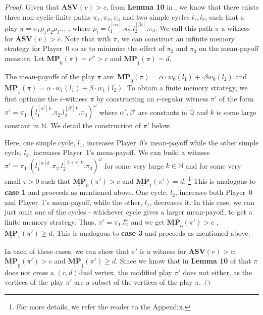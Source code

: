 \begin{proof}
Given that $\mathbf{ASV}(v) > c$, from \textbf{Lemma 10} in \cite{FGR20}, we know that there exists three non-cyclic finite paths $\pi_1, \pi_2, \pi_3$ and two simple cycles $l_1, l_2$, such that a play $\pi = \pi_1\rho_1\rho_2\rho_3\dots$ , where $\rho_i = l_1^{[\alpha i]}.\pi_2.l_2^{[\beta i]}.\pi_3$. We call this path $\pi$ a witness for $\mathbf{ASV}(v) > c$. Note that with $\pi$, we can construct an infinite memory strategy for Player~0 so as to minimize the effect of $\pi_2$ and $\pi_3$ on the mean-payoff measure. Let $\underline{\mathbf{MP}}_0(\pi) = c'' > c$ and $\underline{\mathbf{MP}}_1(\pi) = d$.

\noindent The mean-payoffs of the play $\pi$ are: $\underline{\mathbf{MP}}_0(\pi) = \alpha \cdot w_0(l_1) + \cdot \beta w_0(l_2)$ and $\underline{\mathbf{MP}}_1(\pi) = \alpha \cdot w_1(l_1) + \beta \cdot w_1(l_2)$. To obtain a finite memory strategy, we first optimize the $\epsilon$-witness $\pi$ by constructing an $\epsilon$-regular witness $\pi'$ of the form $\pi' = \pi_1.(l_1^{[\alpha']k}.\pi_2.l_2^{[\beta']k}.\pi_3)^{\omega}$ where $\alpha', \beta'$ are constants in $\mathbb{Q}$ and $k$ is some large constant in $\mathbb{N}$. We detail the construction of $\pi'$ below.
\begin{caseof}
    Here, one simple cycle, $l_1$, increases Player~0's mean-payoff while the other simple cycle, $l_2$, increases Player~1's mean-payoff. We can build a witness $\pi' = \pi_1.(l_1^{[\alpha]k}.\pi_2.l_2^{[\beta+\tau]k}.\pi_3)^{\omega}$ for some very large $k \in \mathbb{N}$ and for some very small $\tau > 0$ such that $\underline{\mathbf{MP}}_0(\pi') > c$ and $\underline{\mathbf{MP}}_1(\pi') = d$. \footnote{For more details, we refer the reader to the Appendix.}
    This is analogous to \textbf{case 1} and proceeds as mentioned above.
    One cycle, $l_2$, increases both Player~0 and Player~1's mean-payoff, while the other, $l_1$, decreases it. In this case, we can just omit one of the cycles - whichever cycle gives a larger mean-payoff, to get a finite memory strategy. Thus, $\pi' = \pi_1.l_2^{\omega}$ and we get $\underline{\mathbf{MP}}_0(\pi') > c$ , $\underline{\mathbf{MP}}_1(\pi') \geqslant d$.
    This is analogous to \textbf{case 3} and proceeds as mentioned above.
\end{caseof}
In each of these cases, we can show that $\pi'$ is a witness for $\mathbf{ASV}(v) > c$: $\underline{\mathbf{MP}}_0(\pi') > c$ and $\underline{\mathbf{MP}}_1(\pi') \geqslant d$. Since we know that in \textbf{Lemma 10} of \cite{FGR20} that $\pi$ does not cross a $(c,d)$-bad vertex, the modified play $\pi'$ does not either, as the vertices of the play $\pi'$ are a subset of the vertices of the play $\pi$. 


\end{proof}
